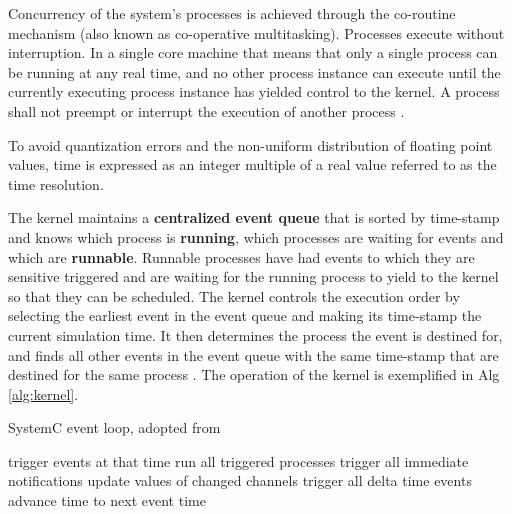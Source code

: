 \documentclass[12pt,twoside]{article}
\begin{document}
Concurrency of the system's processes is achieved through the co-routine mechanism (also known as co-operative multitasking). 
Processes execute without interruption. In a single core machine that means that only a single process can be running at any real time, 
and no other process instance can execute until the currently executing process instance has yielded control to the kernel.
A process shall not preempt or interrupt the execution of another process \cite{OpenSystemCInitiative2012}.

To avoid quantization errors and the non-uniform distribution of floating point values, time is expressed as an integer multiple of a real value referred to as the time resolution. 

The kernel maintains a \textbf{centralized event queue} that is sorted by time-stamp and knows which process is \textbf{running}, which processes are waiting for events and which are \textbf{runnable}.
Runnable processes have had events to which they are sensitive triggered and are waiting for the running process to yield to the kernel so that they can be scheduled.
The kernel controls the execution order by selecting the earliest event in the event queue and making its time-stamp the current simulation time.
It then determines the process the event is destined for, and finds all other events in the event queue with the same time-stamp that are destined for the same process \cite{Black2010}.
The operation of the kernel is exemplified in Alg \ref{alg:kernel}.

\begin{algorithm}
\caption{SystemC event loop, adopted from \cite{Schumacher2010}}
\label{alg:kernel}
\begin{algorithmic}[1]

     
      \State trigger events at that time
         
	     \State run all triggered processes
             \State trigger all immediate notifications
         \EndWhile
         \State update values of changed channels
	 \State trigger all delta time events
       \EndWhile
       \State advance time to next event time
   \EndWhile

\end{algorithmic}
\end{algorithm}
\end{document}
